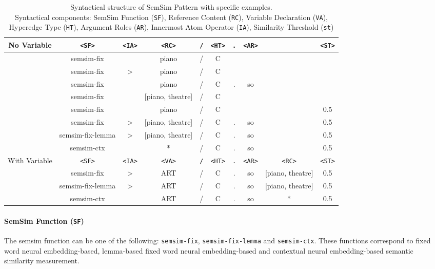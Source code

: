 \documentclass[11pt, numbers=noenddot]{scrreprt}
\begin{document}
\begin{table*}[h!]
\centering
\normalfont\sffamily
\setlength{\tabcolsep}{0pt}
\begin{tabular}{c@{\hspace{20pt}}ccccccccc}
\toprule
\textrm{No Variable}   & \texttt{<SF>} & \texttt{<IA>} & \texttt{<RC>} & \texttt{/} & \texttt{<HT>} & \texttt{.} & \texttt{<AR>} &  & \texttt{<ST>} \\
\midrule
\multirow{5}{*}{}
 & semsim-fix & & piano & / & C &  &   & & \\
 & semsim-fix & > & piano & / & C &  &   & & \\
 & semsim-fix & & piano & / & C & . & so & & \\
 & semsim-fix & & [piano, theatre] & / & C &  &   & & \\
 & semsim-fix & & piano & / & C &  &   & & 0.5 \\
 & semsim-fix & > & [piano, theatre] & / & C & . & so & & 0.5 \\
 & semsim-fix-lemma & > & [piano, theatre] & / & C & . & so & & 0.5 \\
 & semsim-ctx &  & * & / & C & . & so & & 0.5 \\
\midrule
\midrule
\textrm{With Variable} & \texttt{<SF>} & \texttt{<IA>} & \texttt{<VA>} & \texttt{/} & \texttt{<HT>} & \texttt{.} & \texttt{<AR>} & \texttt{<RC>} & \texttt{<ST>} \\
\midrule
 & semsim-fix & > & ART & / & C & . & so & [piano, theatre] & 0.5\\
 & semsim-fix-lemma & > & ART & / & C & . & so & [piano, theatre] & 0.5\\
 & semsim-ctx &  & ART & / & C & . & so & * & 0.5 \\
\bottomrule
\end{tabular}
\caption{
Syntactical structure of SemSim Pattern with specific examples.\\
Syntactical components: SemSim Function (\texttt{SF}), Reference Content (\texttt{RC}),  Variable Declaration (\texttt{VA}), Hyperedge Type (\texttt{HT}), Argument Roles (\texttt{AR}), Innermost Atom Operator (\texttt{IA}), Similarity Threshold (\texttt{\gls{st}})
}
\label{tab:semsim-pattern}
\end{table*}


\paragraph{SemSim Function (\texttt{SF})}
 The semsim function can be one of the following: \texttt{semsim-fix}, \texttt{semsim-fix-lemma} and \texttt{semsim-ctx}. These functions correspond to fixed word neural embedding-based, lemma-based fixed word neural embedding-based and contextual neural embedding-based semantic similarity measurement.
\end{document}
